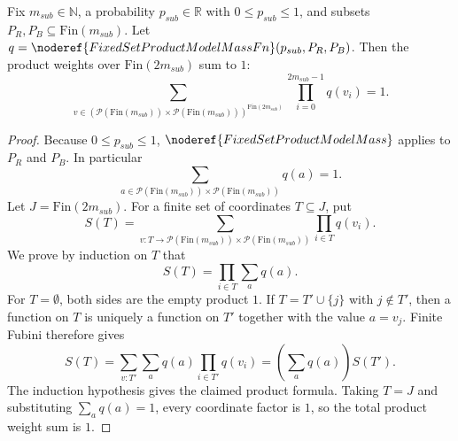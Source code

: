 \begin{helper}
Fix $m_{sub} \in \mathbb{N}$, a probability $p_{sub} \in \mathbb{R}$ with $0 \le p_{sub} \le 1$, and subsets $P_R, P_B \subseteq \mathrm{Fin}(m_{sub})$.
Let $q = \noderef{FixedSetProductModelMassFn}(p_{sub}, P_R, P_B)$.
Then the product weights over $\mathrm{Fin}(2m_{sub})$ sum to $1$:
\[
\sum_{v \in (\mathcal{P}(\mathrm{Fin}(m_{sub})) \times \mathcal{P}(\mathrm{Fin}(m_{sub})))^{\mathrm{Fin}(2m_{sub})}} \prod_{i=0}^{2m_{sub}-1} q(v_i) = 1.
\]
\end{helper}
\begin{proof}
Because \(0\le p_{sub}\le1\), \(\noderef{FixedSetProductModelMass}\)
applies to \(P_R\) and \(P_B\).  In particular
\[
\sum_{a\in
\mathcal P(\mathrm{Fin}(m_{sub}))\times
\mathcal P(\mathrm{Fin}(m_{sub}))} q(a)=1.
\]
Let \(J=\mathrm{Fin}(2m_{sub})\).  For a finite set of coordinates
\(T\subseteq J\), put
\[
S(T)=\sum_{v:T\to
\mathcal P(\mathrm{Fin}(m_{sub}))\times
\mathcal P(\mathrm{Fin}(m_{sub}))}
  \prod_{i\in T}q(v_i).
\]
We prove by induction on \(T\) that
\[
S(T)=\prod_{i\in T}\sum_a q(a).
\]
For \(T=\emptyset\), both sides are the empty product \(1\).  If
\(T=T'\cup\{j\}\) with \(j\notin T'\), then a function on \(T\) is uniquely a
function on \(T'\) together with the value \(a=v_j\).  Finite Fubini therefore
gives
\[
S(T)
=\sum_{v:T'}\sum_a q(a)\prod_{i\in T'}q(v_i)
=\left(\sum_a q(a)\right)S(T').
\]
The induction hypothesis gives the claimed product formula.  Taking
\(T=J\) and substituting \(\sum_a q(a)=1\), every coordinate factor is \(1\),
so the total product weight sum is \(1\).
\end{proof}
